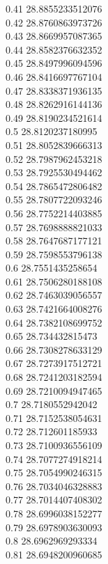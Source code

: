 {0.41	28.8855233512076\\
0.42	28.8760863973726\\
0.43	28.8669957087365\\
0.44	28.8582376632352\\
0.45	28.8497996094596\\
0.46	28.8416697767104\\
0.47	28.8338371936135\\
0.48	28.8262916144136\\
0.49	28.8190234521614\\
0.5	28.8120237180995\\
0.51	28.8052839666313\\
0.52	28.7987962453218\\
0.53	28.7925530494462\\
0.54	28.7865472806482\\
0.55	28.7807722093246\\
0.56	28.7752214403885\\
0.57	28.7698888821033\\
0.58	28.7647687177121\\
0.59	28.7598553796138\\
0.6	28.7551435258654\\
0.61	28.7506280188108\\
0.62	28.7463039056557\\
0.63	28.7421664008276\\
0.64	28.7382108699752\\
0.65	28.734432815473\\
0.66	28.7308278633129\\
0.67	28.7273917512721\\
0.68	28.7241203182594\\
0.69	28.7210094947465\\
0.7	28.7180552942042\\
0.71	28.7152538054631\\
0.72	28.712601185933\\
0.73	28.7100936556109\\
0.74	28.7077274918214\\
0.75	28.7054990246315\\
0.76	28.7034046328883\\
0.77	28.7014407408302\\
0.78	28.6996038152277\\
0.79	28.6978903630093\\
0.8	28.6962969293334\\
0.81	28.6948200960685\\
}
